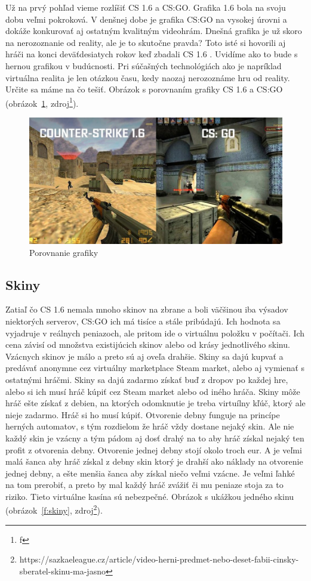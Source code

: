 \documentclass[10pt,oneside,slovak,a4paper]{article}
\begin{document}
Už na prvý pohľad vieme rozlíšiť CS 1.6 a CS:GO. Grafika 1.6 bola na svoju dobu veľmi pokroková. V denšnej dobe je grafika  CS:GO na vysokej úrovni a dokáže konkurovať aj ostatným kvalitným videohrám. Dnešná grafika je už skoro na nerozoznanie od reality, ale je to skutočne pravda? Toto isté si hovorili aj hráči na konci deväťdesiatych rokov keď zbadali CS 1.6 . Uvidíme ako to bude s hernou grafikou v budúcnosti. Pri súčašných technológiách ako je napríklad virtuálna realita je len otázkou času, kedy naozaj nerozoznáme hru od reality. Určite sa máme na čo tešiť. Obrázok s porovnaním grafiky CS 1.6 a CS:GO (obrázok~\ref{f:grafika}, zdroj\footnote{f}).

\begin{figure}[tbh]
\centering
\includegraphics[scale=0.4]{1.6vsgo.jpg}
\caption{Porovnanie grafiky}
\label{f:grafika}
\end{figure}

\subsection{Skiny} \label{porovnanie:skiny}

Zatiaľ čo CS 1.6 nemala mnoho skinov na zbrane a boli väčšinou iba výsadov niektorých serverov, CS:GO ich má tisíce a stále pribúdajú. Ich hodnota sa vyjadruje v reálnych peniazoch, ale pritom ide o virtuálnu položku v počítači. Ich cena závisí od množstva existijúcich skinov alebo od krásy jednotlivého skinu. Vzácnych skinov je málo a preto sú aj oveľa drahšie. Skiny sa dajú kupvať a predávať anonymne cez virtuálny marketplace Steam market, alebo aj vymienať s ostatnými hráčmi.
Skiny sa dajú zadarmo získať buď z dropov po každej hre, alebo si ich musí hráč kúpiť cez Steam market alebo od iného hráča. Skiny môže hráč ešte získať z debien, na ktorých odomknutie je treba virtuílny kľúč, ktorý ale nieje zadarmo. Hráč si ho musí kúpiť. Otvorenie debny funguje na princípe herných automatov, s tým rozdielom že hráč vždy dostane nejaký skin. Ale nie každý skin je vzácny a tým pádom aj dosť drahý na to aby hráč získal nejaký ten profit z otvorenia debny. Otvorenie jednej debny stojí okolo troch eur. A je veľmi malá šanca aby hráč získal z debny skin ktorý je drahší ako náklady na otvorenie jednej debny, a ešte menšia šanca aby získal niečo veľmi vzácne. Je veľmi ľahké na tom prerobiť, a preto by mal každý hráč zvážiť či mu peniaze stoja za to riziko. Tieto virtuálne kasína sú nebezpečné.  Obrázok s ukážkou jedného skinu (obrázok~\ref{f:skiny}, zdroj\footnote{https://sazkaeleague.cz/article/video-herni-predmet-nebo-deset-fabii-cinsky-sberatel-skinu-ma-jasno}).
\end{document}

